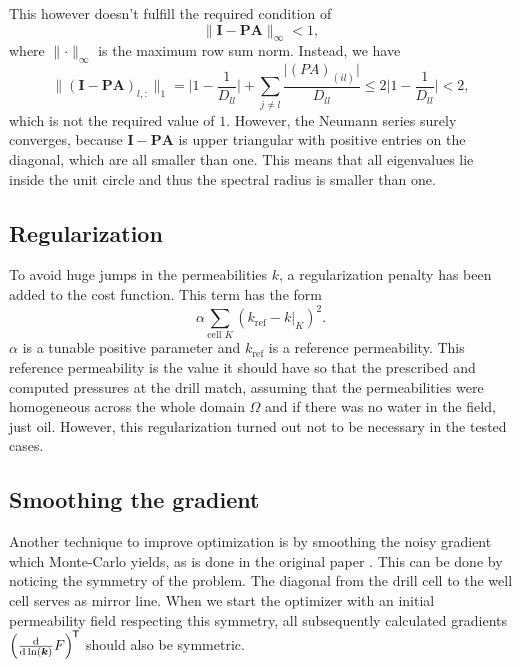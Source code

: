 \documentclass[twoside]{IEEEtran}
\renewcommand*{\d}[1]{\ensuremath{\mathrm{d}#1}}
\newcommand*{\diff}[2]{\ensuremath{\frac{\d}{\d{#2}}{#1}}}
\renewcommand*{\vec}[1]{\ensuremath{{\bm{#1}}}}
\newcommand*{\mat}[1]{\vec{#1}}
\newcommand*{\transpose}[1]{{#1}^{\mkern-1.5mu\mathsf{T}}}
\begin{document}
This however doesn't fulfill the required condition of 
\begin{equation}
\lVert \mat{I} - \mat{PA} \lVert_\infty < 1,
\end{equation}
where $\lVert \cdot \lVert_\infty$ is the maximum row sum norm.
Instead, we have
\begin{equation}
\lVert (\mat{I} - \mat{PA})_{l, :} \lVert_1 = \lvert 1 - \frac{1}{D_{ll}} \rvert + \sum_{j \neq l} \frac{\lvert (PA)_{(il)}\rvert}{D_{ll}} \leq  2\lvert 1 - \frac{1}{D_{ll}} \rvert < 2, 
\end{equation}
which is not the required value of $1$.
However, the Neumann series surely converges, because 
$\mat{I} - \mat{PA}$ is upper triangular with positive entries on the diagonal, which are all smaller than one. This means that all eigenvalues lie inside the unit circle and thus the spectral radius is smaller than one.

\subsection{Regularization}
To avoid huge jumps in the permeabilities $k$, a regularization penalty has been added to the 
cost function. This term has the form
\begin{equation}
\label{regularizationTerm}
\alpha \sum_{\text{cell } K} (k_\text{ref} - k\rvert_K)^2.
\end{equation}
$\alpha$ is a tunable positive parameter and $k_\text{ref}$ is a reference permeability.
This reference permeability is the value it should have so that the prescribed and computed pressures at the drill match, assuming that the permeabilities were homogeneous across the whole domain $\Omega$ and if there was no water in the field, just oil.
However, this regularization turned out not to be necessary in the tested cases.

\subsection{Smoothing the gradient}
Another technique to improve optimization is by smoothing the noisy gradient which Monte-Carlo yields, as is done in the original paper \cite{unsteady}. This can be done by noticing the symmetry of the problem. The diagonal from the drill cell to the well cell serves as mirror line.
When we start the optimizer with an initial permeability field respecting this symmetry, all subsequently calculated gradients $\transpose{\left(\diff{F}{\ln(\vec{k})}\right)}$ should also be symmetric.
\end{document}
